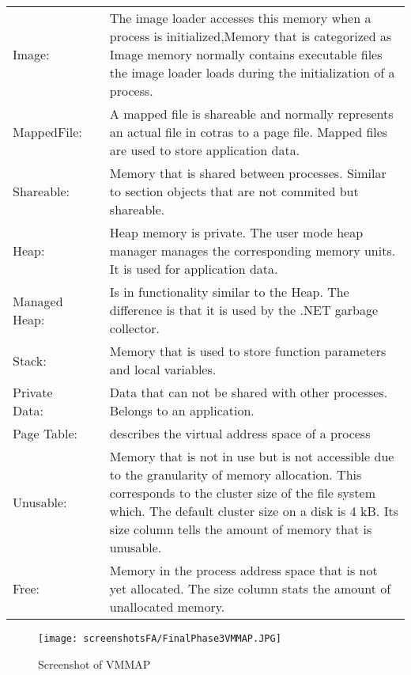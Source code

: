 \documentclass{Gharaei}
\begin{document}
    
\begin{tabular}{l l p{14cm}}
    Image: & &The image loader accesses this memory when a process is initialized,Memory that is categorized as Image memory normally contains executable files the image loader loads during the initialization  of a process.\\
     MappedFile: & &  A mapped file is shareable and normally represents an actual file in cotras to a page file. Mapped files are used to store application data. \\
     Shareable: & & Memory that is shared between processes. Similar to section objects that are not commited but shareable. \\
     Heap:  & & Heap memory is private. The user mode heap manager manages the corresponding memory units. It is used for application data.\\
     Managed Heap:& & Is in functionality similar to the Heap. The difference is that it is used by the .NET garbage collector.\\
     Stack:& & Memory that is used to store function parameters and local variables. \\ 
     Private Data:& &Data that can not be shared with other processes. Belongs to an application. \\
     Page Table: & &describes the virtual address space of a process \\
     Unusable:& &  Memory that is not in use but is not accessible due to the granularity of memory allocation. This corresponds to the cluster size of the file system which. The default cluster size on a disk is 4 kB. Its size column tells the amount of memory that is unusable. \\
     Free:& &  Memory in the process address space that is not yet allocated. The size column stats the amount of unallocated memory.

\end{tabular}
  
\begin{wrapfigure}[29]{r}{9cm}
    
    \texttt{[image: screenshotsFA/FinalPhase3VMMAP.JPG]}
    \caption{Screenshot of VMMAP}
\end{wrapfigure}
\newpage
\end{document}

